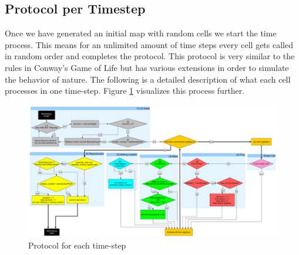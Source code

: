 \documentclass[11pt]{article}
\begin{document}
\subsection{Protocol per Timestep}
Once we have generated an initial map with random cells we start the time process. This means for an unlimited amount of time steps every cell gets called in random order and completes the protocol. This protocol is very similar to the rules in Conway's Game of Life but has various extensions in order to simulate the behavior of nature. The following is a detailed description of what each cell processes in one time-step. Figure \ref{fig:protocol} visualizes this process further.

\thispagestyle{empty}
\begin{figure}[p]
\centering
\vspace*{-2cm}
\includegraphics[angle=90,scale=0.34]{DayProtocol.png}
\caption{Protocol for each time-step}
\label{fig:protocol}
\end{figure}


\setcounter{protocolCounter}{1}
\end{document}
